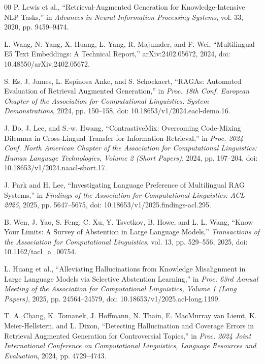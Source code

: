 \documentclass[a4paper,conference]{IEEEtran}
\begin{document}
\balance
\begin{thebibliography}{00}
P. Lewis et al., ``Retrieval-Augmented Generation for Knowledge-Intensive NLP Tasks,'' in \emph{Advances in Neural Information Processing Systems}, vol. 33, 2020, pp. 9459--9474.

L. Wang, N. Yang, X. Huang, L. Yang, R. Majumder, and F. Wei, ``Multilingual E5 Text Embeddings: A Technical Report,'' arXiv:2402.05672, 2024, doi: 10.48550/arXiv.2402.05672.

S. Es, J. James, L. Espinosa Anke, and S. Schockaert, ``RAGAs: Automated Evaluation of Retrieval Augmented Generation,'' in \emph{Proc. 18th Conf. European Chapter of the Association for Computational Linguistics: System Demonstrations}, 2024, pp. 150--158, doi: 10.18653/v1/2024.eacl-demo.16.

J. Do, J. Lee, and S.-w. Hwang, ``ContrastiveMix: Overcoming Code-Mixing Dilemma in Cross-Lingual Transfer for Information Retrieval,'' in \emph{Proc. 2024 Conf. North American Chapter of the Association for Computational Linguistics: Human Language Technologies, Volume 2 (Short Papers)}, 2024, pp. 197--204, doi: 10.18653/v1/2024.naacl-short.17.

J. Park and H. Lee, ``Investigating Language Preference of Multilingual RAG Systems,'' in \emph{Findings of the Association for Computational Linguistics: ACL 2025}, 2025, pp. 5647--5675, doi: 10.18653/v1/2025.findings-acl.295.

B. Wen, J. Yao, S. Feng, C. Xu, Y. Tsvetkov, B. Howe, and L. L. Wang, ``Know Your Limits: A Survey of Abstention in Large Language Models,'' \emph{Transactions of the Association for Computational Linguistics}, vol. 13, pp. 529--556, 2025, doi: 10.1162/tacl\_a\_00754.

L. Huang et al., ``Alleviating Hallucinations from Knowledge Misalignment in Large Language Models via Selective Abstention Learning,'' in \emph{Proc. 63rd Annual Meeting of the Association for Computational Linguistics, Volume 1 (Long Papers)}, 2025, pp. 24564--24579, doi: 10.18653/v1/2025.acl-long.1199.

T. A. Chang, K. Tomanek, J. Hoffmann, N. Thain, E. MacMurray van Liemt, K. Meier-Hellstern, and L. Dixon, ``Detecting Hallucination and Coverage Errors in Retrieval Augmented Generation for Controversial Topics,'' in \emph{Proc. 2024 Joint International Conference on Computational Linguistics, Language Resources and Evaluation}, 2024, pp. 4729--4743.


\end{thebibliography}
\end{document}
